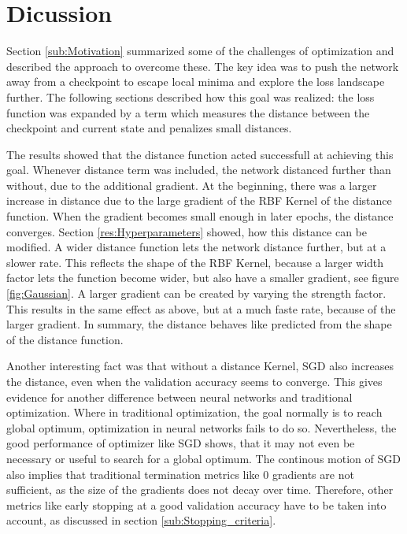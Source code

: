 \chapter{Dicussion}

Section \ref{sub:Motivation} summarized some of the challenges of optimization
and described the approach to overcome these. The key idea was to push the
network away from a checkpoint to escape local minima and explore the loss
landscape further. The following sections described how this goal was realized:
the loss function was expanded by a term which measures the distance between the
checkpoint and current state and penalizes small distances.

The results showed that the distance function acted successfull at achieving
this goal. Whenever distance term was included, the network distanced further
than without, due to the additional gradient. At the beginning, there was a
larger increase in distance due to the large gradient of the RBF Kernel of the
distance function. When the gradient becomes small enough in later epochs, the
distance converges. Section \ref{res:Hyperparameters} showed, how this
distance can be modified. A wider distance function lets the network distance
further, but at a slower rate. This reflects the shape of the RBF Kernel,
because a larger width factor lets the function become wider, but also have a
smaller gradient, see figure \ref{fig:Gaussian}. A larger gradient can be
created by varying the strength factor. This results in the same effect as
above, but at a much faste rate, because of the larger gradient. In summary, the
distance behaves like predicted from the shape of the distance function.


Another interesting fact was that without a distance Kernel,
SGD also increases the distance, even when the validation accuracy seems to
converge. This gives evidence for another difference between neural networks and
traditional optimization. Where in traditional optimization, the goal normally
is to reach global optimum, optimization in neural networks fails to do so.
Nevertheless, the good performance of optimizer like SGD shows, that it may not
even be necessary or useful to search for a global optimum. The continous motion
of SGD also implies that traditional termination metrics like 0 gradients are
not sufficient, as the size of the gradients does not decay over time. Therefore,
other metrics like early stopping at a good validation accuracy have to be taken
into account, as discussed in section \ref{sub:Stopping_criteria}.
\newline

